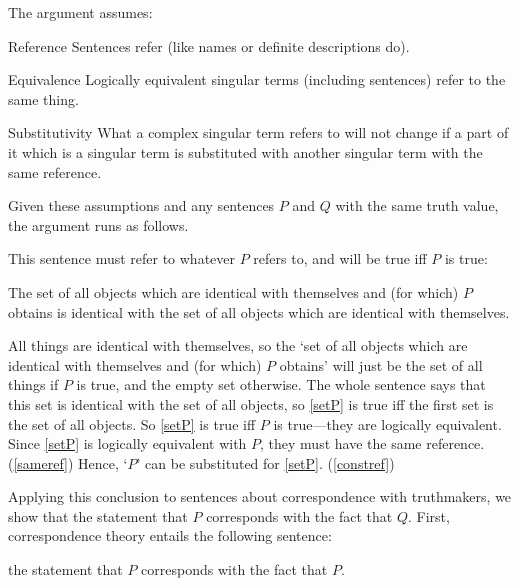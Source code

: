 The argument assumes:
\parencite[753]{Davidson_1969}

	\begin{principle}{Reference} \label{srefer}
	Sentences refer (like names or definite descriptions do).
	\end{principle}

	\begin{principle}{Equivalence} \label{sameref}
	Logically equivalent singular terms (including sentences) refer to the same thing.
	\end{principle}

	\begin{principle}{Substitutivity} \label{constref}
	What a complex singular term refers to will not change if a part of it which is a singular term is substituted with another singular term with the same reference.
	\end{principle}


Given these assumptions and any sentences $P$ and $Q$ with the same truth value, the argument runs as follows.

This sentence must refer to whatever $P$ refers to, and will be true iff $P$ is true:

	\begin{example} \label{setP}
	The set of all objects which are identical with themselves and (for which) $P$ obtains is identical with the set of all objects which are identical with themselves.
	\end{example}

All things are identical with themselves, so the `set of all objects which are identical with themselves and (for which) $P$ obtains' will just be the set of all things if $P$ is true, and the empty set otherwise.
The whole sentence says that this set is identical with the set of all objects, so \ref{setP} is true iff the first set is the set of all objects.
So \ref{setP} is true iff $P$ is true---they are logically equivalent.
Since \ref{setP} is logically equivalent with $P$, they must have the same reference.
(\ref{sameref})
Hence, `$P$' can be substituted for \ref{setP}.
(\ref{constref})

Applying this conclusion to sentences about correspondence with truthmakers, we show that the statement that $P$ corresponds with the fact that $Q$.
First, correspondence theory entails the following sentence:

	\begin{example} \label{stateP}
	the statement that $P$ corresponds with the fact that $P$.
	\end{example}

